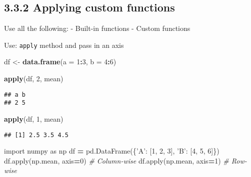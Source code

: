\documentclass[]{book}
\newenvironment{Shaded}{\begin{snugshade}}{\end{snugshade}}
\newcommand{\BuiltInTok}[1]{#1}
\newcommand{\CommentTok}[1]{\textcolor[rgb]{0.56,0.35,0.01}{\textit{#1}}}
\newcommand{\DataTypeTok}[1]{\textcolor[rgb]{0.13,0.29,0.53}{#1}}
\newcommand{\DecValTok}[1]{\textcolor[rgb]{0.00,0.00,0.81}{#1}}
\newcommand{\ImportTok}[1]{#1}
\newcommand{\KeywordTok}[1]{\textcolor[rgb]{0.13,0.29,0.53}{\textbf{#1}}}
\newcommand{\NormalTok}[1]{#1}
\newcommand{\OperatorTok}[1]{\textcolor[rgb]{0.81,0.36,0.00}{\textbf{#1}}}
\newcommand{\StringTok}[1]{\textcolor[rgb]{0.31,0.60,0.02}{#1}}
\theoremstyle{definition}
\theoremstyle{definition}
\theoremstyle{definition}
\theoremstyle{remark}
\begin{document}
\hypertarget{applying-custom-functions}{%
\subsection{3.3.2 Applying custom
functions}\label{applying-custom-functions}}

Use all the following: - Built-in functions - Custom functions

Use: \texttt{apply} method and pass in an axis

\begin{Shaded}
\begin{Highlighting}[]
\NormalTok{df <-}\StringTok{ }\KeywordTok{data.frame}\NormalTok{(}\DataTypeTok{a =} \DecValTok{1}\OperatorTok{:}\DecValTok{3}\NormalTok{,}
                 \DataTypeTok{b =} \DecValTok{4}\OperatorTok{:}\DecValTok{6}\NormalTok{)}

\KeywordTok{apply}\NormalTok{(df, }\DecValTok{2}\NormalTok{, mean)}
\end{Highlighting}
\end{Shaded}

\begin{verbatim}
## a b 
## 2 5
\end{verbatim}

\begin{Shaded}
\begin{Highlighting}[]
\KeywordTok{apply}\NormalTok{(df, }\DecValTok{1}\NormalTok{, mean)}
\end{Highlighting}
\end{Shaded}

\begin{verbatim}
## [1] 2.5 3.5 4.5
\end{verbatim}

\begin{Shaded}
\begin{Highlighting}[]
\ImportTok{import}\NormalTok{ numpy }\ImportTok{as}\NormalTok{ np}
\NormalTok{df }\OperatorTok{=}\NormalTok{ pd.DataFrame(\{}\StringTok{'A'}\NormalTok{: [}\DecValTok{1}\NormalTok{, }\DecValTok{2}\NormalTok{, }\DecValTok{3}\NormalTok{],}
                   \StringTok{'B'}\NormalTok{: [}\DecValTok{4}\NormalTok{, }\DecValTok{5}\NormalTok{, }\DecValTok{6}\NormalTok{]\})}
\NormalTok{df.}\BuiltInTok{apply}\NormalTok{(np.mean, axis}\OperatorTok{=}\DecValTok{0}\NormalTok{) }\CommentTok{# Column-wise}
\NormalTok{df.}\BuiltInTok{apply}\NormalTok{(np.mean, axis}\OperatorTok{=}\DecValTok{1}\NormalTok{) }\CommentTok{# Row-wise}
\end{Highlighting}
\end{Shaded}
\end{document}
